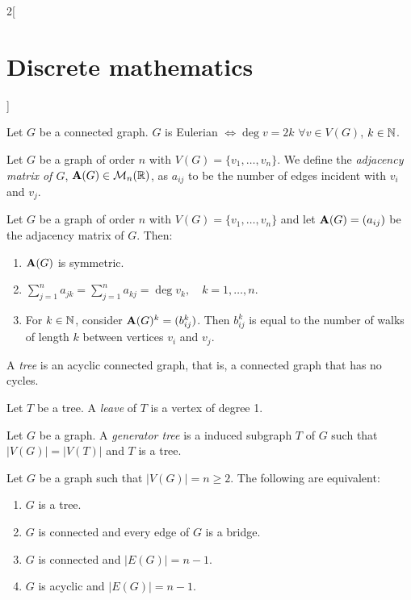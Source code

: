 \documentclass[../../../main.tex]{subfiles}
\begin{document}
\begin{multicols}{2}[\section{Discrete mathematics}]
\begin{definition}
  \end{definition}
  \begin{theorem}
    Let $G$ be a connected graph. $G$ is Eulerian $\iff\deg v=2k$ $\forall v\in V(G)$, $k\in\mathbb{N} $.
  \end{theorem}
  \begin{definition}
    Let $G$ be a graph of order $n$ with $V(G)=\{v_1,\ldots,v_n\}$. We define the \textit{adjacency matrix of $G$}, $\boldsymbol{\mathrm{A}}(G)\in\mathcal{M}_n(\mathbb{R} )$, as $a_{ij}$ to be the number of edges incident with $v_i$ and $v_j$.
  \end{definition}
  \begin{prop}
    Let $G$ be a graph of order $n$ with $V(G)=\{v_1,\ldots,v_n\}$ and let $\boldsymbol{\mathrm{A}}(G)=(a_{ij})$ be the adjacency matrix of $G$. Then:
    \begin{enumerate}
      \item $\boldsymbol{\mathrm{A}}(G)$ is symmetric.
      \item $\displaystyle\sum_{j=1}^n a_{jk}=\sum_{j=1}^n a_{kj}=\deg v_k,\quad k=1,\ldots,n$.
      \item For $k\in\mathbb{N} $, consider $\boldsymbol{\mathrm{A}}(G)^k=(b_{ij}^k)$. Then $b_{ij}^k$ is equal to the number of walks of length $k$ between vertices $v_i$ and $v_j$.
    \end{enumerate}
  \end{prop}
  \begin{definition}
    A \textit{tree} is an acyclic connected graph, that is, a connected graph that has no cycles.
  \end{definition}
  \begin{definition}
    Let $T$ be a tree. A \textit{leave} of $T$ is a vertex of degree 1.
  \end{definition}
  \begin{definition}
    Let $G$ be a graph. A \textit{generator tree} is a induced subgraph $T$ of $G$ such that $|V(G)|=|V(T)|$ and $T$ is a tree.
  \end{definition}
  \begin{prop}
    Let $G$ be a graph such that $|V(G)|=n\geq 2$. The following are equivalent:
    \begin{enumerate}
      \item $G$ is a tree.
      \item $G$ is connected and every edge of $G$ is a bridge.
      \item $G$ is connected and $|E(G)|=n-1$.
      \item $G$ is acyclic and $|E(G)|=n-1$.

\end{enumerate}
\end{prop}
\end{multicols}
\end{document}
